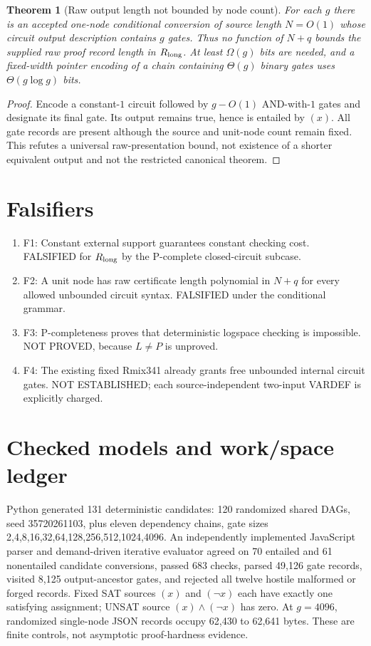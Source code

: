 \documentclass[11pt]{article}
\newtheorem{theorem}{Theorem}
\begin{document}
\begin{theorem}[Raw output length not bounded by node count]
For each $g$ there is an accepted one-node conditional conversion of source length $N=O(1)$ whose circuit output description contains $g$ gates. Thus no function of $N+q$ bounds the supplied raw proof record length in $R_{\rm long}$. At least $\Omega(g)$ bits are needed, and a fixed-width pointer encoding of a chain containing $\Theta(g)$ binary gates uses $\Theta(g\log g)$ bits.
\end{theorem}
\begin{proof}
Encode a constant-$1$ circuit followed by $g-O(1)$ AND-with-$1$ gates and designate its final gate. Its output remains true, hence is entailed by $(x)$. All gate records are present although the source and unit-node count remain fixed. This refutes a universal raw-presentation bound, not existence of a shorter equivalent output and not the restricted canonical theorem.
\end{proof}

\section*{Falsifiers}
\begin{enumerate}
\item[] F1: Constant external support guarantees constant checking cost. FALSIFIED for $R_{\rm long}$ by the P-complete closed-circuit subcase.
\item[] F2: A unit node has raw certificate length polynomial in $N+q$ for every allowed unbounded circuit syntax. FALSIFIED under the conditional grammar.
\item[] F3: P-completeness proves that deterministic logspace checking is impossible. NOT PROVED, because $L\neq P$ is unproved.
\item[] F4: The existing fixed Rmix341 already grants free unbounded internal circuit gates. NOT ESTABLISHED; each source-independent two-input VARDEF is explicitly charged.
\end{enumerate}

\section*{Checked models and work/space ledger}
Python generated 131 deterministic candidates: 120 randomized shared DAGs, seed 35720261103, plus eleven dependency chains, gate sizes 2,4,8,16,32,64,128,256,512,1024,4096. An independently implemented JavaScript parser and demand-driven iterative evaluator agreed on 70 entailed and 61 nonentailed candidate conversions, passed 683 checks, parsed 49,126 gate records, visited 8,125 output-ancestor gates, and rejected all twelve hostile malformed or forged records. Fixed SAT sources $(x)$ and $(\neg x)$ each have exactly one satisfying assignment; UNSAT source $(x)\land(\neg x)$ has zero. At $g=4096$, randomized single-node JSON records occupy 62,430 to 62,641 bytes. These are finite controls, not asymptotic proof-hardness evidence.
\end{document}
